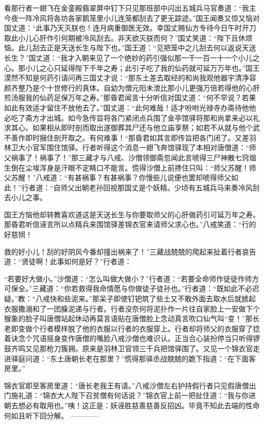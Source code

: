 \documentclass[12pt,UTF8]{ctexbook}
\begin{document}
{	看那行者一翅飞在金銮殿翡翠屏中钉下只见那班部中闪出五城兵马官奏道：“我主今夜一阵冷风将各坊各家鹅笼里小儿连笼都刮去了更无踪迹。”国王闻奏又惊又恼对国丈道：“此事乃天灭朕也！连月病重御医无效。幸国丈赐仙方专待今日午时开刀取此小儿心肝作引何期被冷风刮去。非天欲灭朕而何？”国丈笑道：“陛下且休烦恼。此儿刮去正是天送长生与陛下也。”国王道：“见把笼中之儿刮去何以返说天送长生？”国丈道：“我才入朝来见了一个绝妙的药引强似那一千一百一十一个小儿之心。那小儿之心只延得陛下千年之寿；此引子吃了我的仙药就可延万万年也。”国王漠然不知是何药引请问再三国丈才说：“那东土差去取经的和尚我观他器宇清净容颜齐整乃是个十世修行的真体。自幼为僧元阳未泄比那小儿更强万倍若得他的心肝煎汤服我的仙药足保万年之寿。”那昏君闻言十分听信对国丈道：“何不早说？若果如此有效适才留住不放他去了。”国丈道：“此何难哉！适才吩咐光禄寺办斋待他他必吃了斋方才出城。如今急传旨将各门紧闭点兵围了金亭馆驿将那和尚拿来必以礼求其心。如果相从即时剖而取出遂御葬其尸还与他立庙享祭；如若不从就与他个武不善作即时捆住剖开取之。有何难事！“那昏君如其言即传旨把各门闭了。又差羽林卫大小官军围住馆驿。行者听得这个消息一翅飞奔馆驿现了本相对唐僧道：“师父祸事了！祸事了！”那三藏才与八戒、沙僧领御斋忽闻此言唬得三尸神散七窍烟生倒在尘埃浑身是汗眼不定睛口不能言。慌得沙僧上前搀住只叫：“师父苏醒！师父苏醒！”八戒道：“有甚祸事？有甚祸事？你慢些儿说便也罢却唬得师父如此！”行者道：“自师父出朝老孙回视那国丈是个妖精。少顷有五城兵马来奏冷风刮去小儿之事。
	
	国王方恼他却转教喜欢道这是天送长生与你要取师父的心肝做药引可延万年之寿。那昏君听信诬言所以点精兵来围馆驿差锦衣官来请师父求心也。”八戒笑道：“行的好慈悯！
	
	救的好小儿！刮的好阴风今番却撞出祸来了！”三藏战兢兢的爬起来扯着行者哀告道：“贤徒啊！此事如何是好？”行者道：
	
	“若要好大做小。”沙僧道：“怎么叫做大做小？”行者道：“若要全命师作徒徒作师方可保全。”三藏道：“你若救得我命情愿与你做徒子徒孙也。”行者道：“既如此不必迟疑。”教：“八戒快和些泥来。”那呆子即使钉钯筑了些土又不敢外面去取水后就掳起衣服撒溺和了一团臊泥递与行者。行者没奈何将泥扑作一片往自家脸上一安做下个猴象的脸子叫唐僧站起休动再莫言语贴在唐僧脸上念动真言吹口仙气叫“变！”那长老即变做个行者模样脱了他的衣服以行者的衣服穿上。行者却将师父的衣服穿了捻着诀念个咒语摇身变作唐僧的嘴脸八戒沙僧也难识认。正当合心装扮停当只听得锣鼓齐鸣又见那枪刀簇拥。原来是羽林卫官领三千兵把馆驿围了。又见一个锦衣官走进驿庭问道：“东土唐朝长老在那里？”慌得那驿丞战兢兢的跪下指道：“在下面客房里。”
	
	锦衣官即至客房里道：“唐长老我王有请。”八戒沙僧左右护持假行者只见假唐僧出门施礼道：“锦衣大人陛下召贫僧有何话说？”锦衣官上前一把扯住道：“我与你进朝去想必有取用也。”咦！这正是：妖诬胜慈善慈善反招凶。毕竟不知此去端的性命何如且听下回分解。
	------------
	
}
\end{document}
